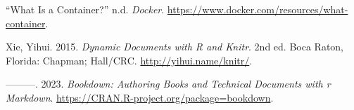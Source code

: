 \documentclass[
]{book}
\newlength{\cslhangindent}
\newlength{\cslentryspacingunit} %
\newenvironment{CSLReferences}[2] %
 {%
  \setlength{\parindent}{0pt}
  \ifodd #1
  \let\oldpar\par
  \def\par{\hangindent=\cslhangindent\oldpar}
  \fi
  \setlength{\parskip}{#2\cslentryspacingunit}
 }%
 {}
\begin{document}
\hypertarget{refs}{}
\begin{CSLReferences}{1}{0}
\leavevmode{}%
{``What Is a Container?''} n.d. \emph{Docker}. \url{https://www.docker.com/resources/what-container}.

\leavevmode{}%
Xie, Yihui. 2015. \emph{Dynamic Documents with {R} and Knitr}. 2nd ed. Boca Raton, Florida: Chapman; Hall/CRC. \url{http://yihui.name/knitr/}.

\leavevmode{}%
---------. 2023. \emph{Bookdown: Authoring Books and Technical Documents with r Markdown}. \url{https://CRAN.R-project.org/package=bookdown}.

\end{CSLReferences}
\end{document}
